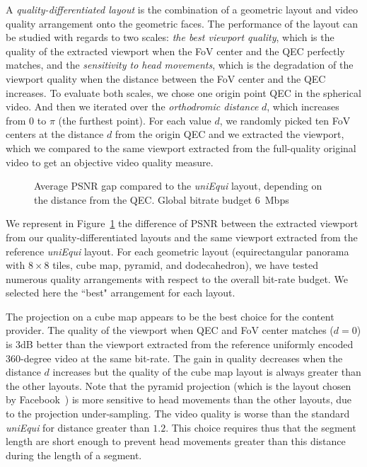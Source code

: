 
A \textit{quality-differentiated layout} is the combination of a geometric layout and video quality 
arrangement onto the geometric faces. The performance of the layout can be studied with
regards to two scales: \emph{the best viewport quality}, which is the quality of the extracted viewport 
when the FoV center and the QEC perfectly matches, and the \emph{sensitivity to head movements}, 
which is the degradation of the viewport quality when the distance between the FoV center 
and the QEC increases. 
To evaluate both scales, we chose one origin point \ac{QEC} in the spherical video. And then we iterated
over the \emph{orthodromic distance} $d$, which increases from 0 to $\pi$ (the furthest point). For each
value $d$, we randomly picked ten \ac{FoV} centers at the distance $d$ from the origin \ac{QEC}
and we extracted the viewport, which we compared to the same viewport extracted from the 
full-quality original video to get an objective video quality measure.

\begin{figure}
    
    \caption{Average \acs{PSNR} gap compared to the \emph{uniEqui} layout, depending on the distance from the \acs{QEC}. Global bitrate budget \SI{6}{\mega bps}}
    \label{fig:dist_quality_psnr}
\end{figure}

We represent in Figure~\ref{fig:dist_quality_psnr} the difference of \ac{PSNR} between
the extracted viewport from our quality-differentiated layouts and the same viewport extracted from
the reference \textit{uniEqui} layout. For each geometric layout (equirectangular 
panorama with $8\times 8$ tiles, cube map, pyramid, and dodecahedron), we have tested 
numerous quality arrangements with respect to the overall bit-rate budget. We selected
here the ``best" arrangement for each layout.

The projection on a cube map appears to be the best choice for the content provider. The quality of
the viewport when QEC and FoV center matches ($d=0$) is 3dB better than the viewport extracted
from the reference uniformly encoded 360-degree video at the same bit-rate. The gain in quality 
decreases when the distance $d$ increases but the quality of the cube map layout is always greater 
than the other layouts. Note that the pyramid projection (which is the layout chosen 
by Facebook~\cite{facebook}) is more sensitive to head movements than
the other layouts, due to the projection under-sampling. The video quality is worse than
the standard \emph{uniEqui} for distance greater than $1.2$. This choice requires thus
that the segment length are short enough to prevent head movements greater than this
distance during the length of a segment.

